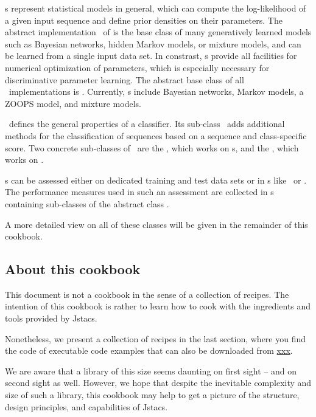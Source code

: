 \StatMod s represent statistical models in general, which can compute the log-likelihood of a given input sequence and define prior densities on their parameters. The abstract implementation \AbstractTrainSM~of \TrainSM is the base class of many generatively learned models such as Bayesian networks, hidden Markov models, or mixture models, and can be learned from a single input data set. In constrast, \DiffSM s provide all facilities for numerical optimization of parameters, which is especially necessary for discriminative parameter learning. The abstract base class of all \DiffSM~implementations is \AbstractDiffSM. Currently, \DiffSM s include Bayesian networks, Markov models, a ZOOPS model, and mixture models.

\AbstractClassifier~defines the general properties of a classifier. Its sub-class \AbstractScoreBasedClassifier~adds additional methods for the classification of sequences based on a sequence and class-specific score.
Two concrete sub-classes of \AbstractScoreBasedClassifier~are the \TrainSMBasedClassifier, which works on \TrainSM s, and the \GenDisMixClassifier, which works on \DiffSM.

\AbstractClassifier s can be assessed either on dedicated training and test data sets or in \ClassifierAssessment s like \KFoldCrossValidation~or \RepeatedHoldOutExperiment. The performance measures used in such an assessment are collected in \PerformanceMeasureParameterSet s containing sub-classes of the abstract class \AbstractPerformanceMeasure.

A more detailed view on all of these classes will be given in the remainder of this cookbook.

\subsection{About this cookbook}

This document is not a cookbook in the sense of a collection of recipes. The intention of this cookbook is rather to learn how to cook with the ingredients and tools provided by Jstacs.

Nonetheless, we present a collection of recipes in the last section, where you find the code of executable code examples that can also be downloaded from \textcolor{red}{\url{xxx}}.

We are aware that a library of this size seems daunting on first sight -- and on second sight as well. However, we hope that despite the inevitable complexity and size of such a library, this cookbook may help to get a picture of the structure, design principles, and capabilities of Jstacs.

